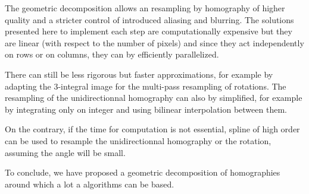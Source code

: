 









The geometric decomposition allows an resampling by homography of higher quality and a stricter control of introduced aliasing and blurring. The solutions presented here to implement each step are computationally expensive but they are linear (with respect to the number of pixels) and since they act independently on rows or on columns, they can by efficiently parallelized.

There can still be less rigorous but faster approximations, for example by adapting the 3-integral image for the multi-pass resampling of rotations. The resampling of the unidirectionnal homography can also by simplified, for example by integrating only on integer and using bilinear interpolation between them.

On the contrary, if the time for computation is not essential, spline of high order can be used to resample the unidirectionnal homography or the rotation, assuming the angle will be small.

To conclude, we have proposed a geometric decomposition of homographies around which a lot a algorithms can be based.
